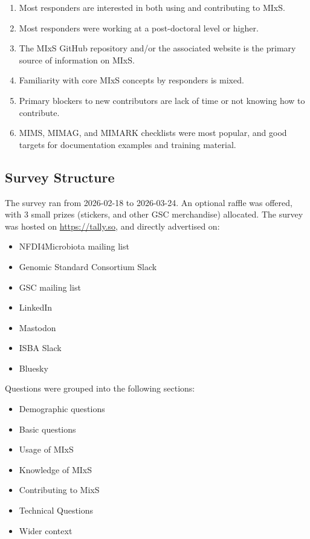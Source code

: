\documentclass[
  letterpaper,
  DIV=11,
  numbers=noendperiod]{scrartcl}
\providecommand{\tightlist}{%
  \setlength{\itemsep}{0pt}\setlength{\parskip}{0pt}}
\begin{document}
\begin{enumerate}
\def\labelenumi{\arabic{enumi}.}
\tightlist
\item
  Most responders are interested in both using and contributing to MIxS.
\item
  Most responders were working at a post-doctoral level or higher.
\item
  The MIxS GitHub repository and/or the associated website is the
  primary source of information on MIxS.
\item
  Familiarity with core MIxS concepts by responders is mixed.
\item
  Primary blockers to new contributors are lack of time or not knowing
  how to contribute.
\item
  MIMS, MIMAG, and MIMARK checklists were most popular, and good targets
  for documentation examples and training material.
\end{enumerate}

\subsection{Survey Structure}\label{survey-structure}

The survey ran from 2026-02-18 to 2026-03-24. An optional raffle was
offered, with 3 small prizes (stickers, and other GSC merchandise)
allocated. The survey was hosted on \url{https://tally.so}, and directly
advertised on:

\begin{itemize}
\tightlist
\item
  NFDI4Microbiota mailing list
\item
  Genomic Standard Consortium Slack
\item
  GSC mailing list
\item
  LinkedIn
\item
  Mastodon
\item
  ISBA Slack
\item
  Bluesky
\end{itemize}

Questions were grouped into the following sections:

\begin{itemize}
\tightlist
\item
  Demographic questions
\item
  Basic questions
\item
  Usage of MIxS
\item
  Knowledge of MIxS
\item
  Contributing to MixS
\item
  Technical Questions
\item
  Wider context
\end{itemize}
\end{document}
